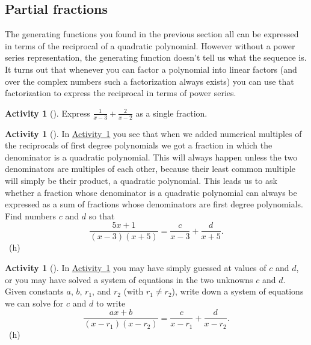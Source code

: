 \documentclass[10pt,]{book}
\theoremstyle{plain}
\theoremstyle{definition}
\theoremstyle{definition}
\theoremstyle{definition}
\newtheorem{activity}[project]{Activity}
\numberwithin{equation}{chapter}
\begin{document}
\subsection[{Partial fractions}]{Partial fractions}\label{subsection-38}
\hypertarget{p-1353}{}%
The generating functions you found in the previous section all can be expressed in terms of the reciprocal of a quadratic polynomial. However without a power series representation, the generating function doesn't tell us what the sequence is. It turns out that whenever you can factor a polynomial into linear factors (and over the complex numbers such a factorization always exists) you can use that factorization to express the reciprocal in terms of power series.%
\begin{activity}[]\label{simplifysumoffractions}
\hypertarget{p-1354}{}%
Express \(\frac{1}{x-3} + \frac{2}{x-2}\) as a single fraction.%
\end{activity}
\begin{activity}[]\label{partialfractionsintro}
\hypertarget{p-1356}{}%
In \hyperref[simplifysumoffractions]{Activity~\ref{simplifysumoffractions}} you see that when we added numerical multiples of the reciprocals of first degree polynomials we got a fraction in which the denominator is a quadratic polynomial. This will always happen unless the two denominators are multiples of each other, because their least common multiple will simply be their product, a quadratic polynomial. This leads us to ask whether a fraction whose denominator is a quadratic polynomial can always be expressed as a sum of fractions whose denominators are first degree polynomials. Find numbers \(c\) and \(d\) so that%
\begin{equation*}
\frac{5x+1}{(x-3)(x+5)} = \frac{c}{x-3} + \frac{d}{x+5}.
\end{equation*}
%
~{\tiny (h)}\end{activity}
\begin{activity}[]\label{partialfractions1}
\hypertarget{p-1359}{}%
In \hyperref[partialfractionsintro]{Activity~\ref{partialfractionsintro}} you may have simply guessed at values of \(c\) and \(d\), or you may have solved a system of equations in the two unknowns \(c\) and \(d\). Given constants \(a\), \(b\), \(r_1\), and \(r_2\) (with \(r_1\not= r_2\)), write down a system of equations we can solve for \(c\) and \(d\) to write%
\begin{equation*}
\frac{ax+b}{(x-r_1)(x-r_2)} = \frac{c}{x-r_1} + \frac{d}{x-r_2}\text{.}
\end{equation*}
%
~{\tiny (h)}\end{activity}
\end{document}
